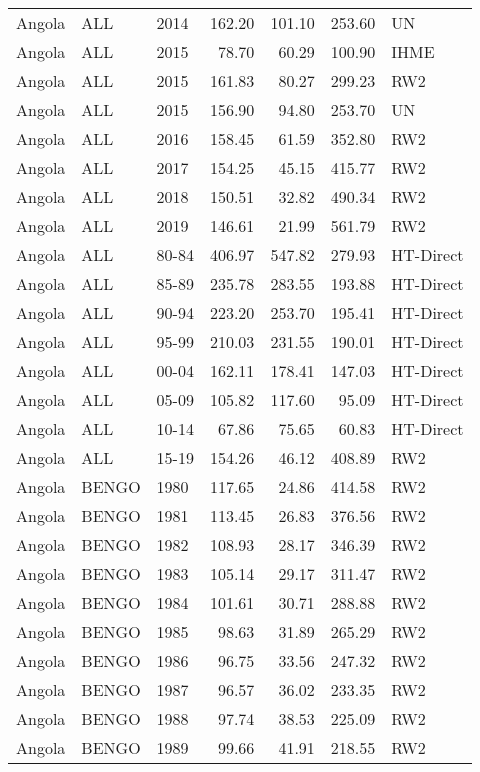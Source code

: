 \begin{longtable}{lllrrrl}
  Angola & ALL & 2014 & 162.20 & 101.10 & 253.60 & UN \\ 
  Angola & ALL & 2015 & 78.70 & 60.29 & 100.90 & IHME \\ 
  Angola & ALL & 2015 & 161.83 & 80.27 & 299.23 & RW2 \\ 
  Angola & ALL & 2015 & 156.90 & 94.80 & 253.70 & UN \\ 
  Angola & ALL & 2016 & 158.45 & 61.59 & 352.80 & RW2 \\ 
  Angola & ALL & 2017 & 154.25 & 45.15 & 415.77 & RW2 \\ 
  Angola & ALL & 2018 & 150.51 & 32.82 & 490.34 & RW2 \\ 
  Angola & ALL & 2019 & 146.61 & 21.99 & 561.79 & RW2 \\ 
  Angola & ALL & 80-84 & 406.97 & 547.82 & 279.93 & HT-Direct \\ 
  Angola & ALL & 85-89 & 235.78 & 283.55 & 193.88 & HT-Direct \\ 
  Angola & ALL & 90-94 & 223.20 & 253.70 & 195.41 & HT-Direct \\ 
  Angola & ALL & 95-99 & 210.03 & 231.55 & 190.01 & HT-Direct \\ 
  Angola & ALL & 00-04 & 162.11 & 178.41 & 147.03 & HT-Direct \\ 
  Angola & ALL & 05-09 & 105.82 & 117.60 & 95.09 & HT-Direct \\ 
  Angola & ALL & 10-14 & 67.86 & 75.65 & 60.83 & HT-Direct \\ 
  Angola & ALL & 15-19 & 154.26 & 46.12 & 408.89 & RW2 \\ 
  Angola & BENGO & 1980 & 117.65 & 24.86 & 414.58 & RW2 \\ 
  Angola & BENGO & 1981 & 113.45 & 26.83 & 376.56 & RW2 \\ 
  Angola & BENGO & 1982 & 108.93 & 28.17 & 346.39 & RW2 \\ 
  Angola & BENGO & 1983 & 105.14 & 29.17 & 311.47 & RW2 \\ 
  Angola & BENGO & 1984 & 101.61 & 30.71 & 288.88 & RW2 \\ 
  Angola & BENGO & 1985 & 98.63 & 31.89 & 265.29 & RW2 \\ 
  Angola & BENGO & 1986 & 96.75 & 33.56 & 247.32 & RW2 \\ 
  Angola & BENGO & 1987 & 96.57 & 36.02 & 233.35 & RW2 \\ 
  Angola & BENGO & 1988 & 97.74 & 38.53 & 225.09 & RW2 \\ 
  Angola & BENGO & 1989 & 99.66 & 41.91 & 218.55 & RW2 \\ 

\end{longtable}
